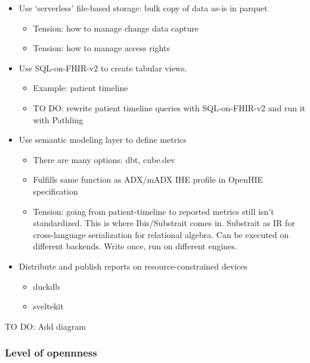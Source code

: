 \documentclass[
  authoryear]{elsarticle}
\providecommand{\tightlist}{%
  \setlength{\itemsep}{0pt}\setlength{\parskip}{0pt}}\usepackage{longtable,booktabs,array}
\begin{document}
\begin{itemize}
\tightlist
\item
  Use `serverless' file-based storage: bulk copy of data as-is in
  parquet

  \begin{itemize}
  \tightlist
  \item
    Tension: how to manage change data capture
  \item
    Tension: how to manage access rights
  \end{itemize}
\item
  Use SQL-on-FHIR-v2 to create tabular views.

  \begin{itemize}
  \tightlist
  \item
    Example: patient timeline
  \item
    TO DO: rewrite patient timeline queries with SQL-on-FHIR-v2 and run
    it with Pathling
  \end{itemize}
\item
  Use semantic modeling layer to define metrics

  \begin{itemize}
  \tightlist
  \item
    There are many options: dbt, cube.dev
  \item
    Fulfills same function as ADX/mADX IHE profile in OpenHIE
    specification
  \item
    Tension: going from patient-timeline to reported metrics still isn't
    standardized. This is where Ibis/Substrait comes in. Substrait as IR
    for cross-language serialization for relational algebra. Can be
    executed on different backends. Write once, run on different
    engines.
  \end{itemize}
\item
  Distribute and publish reports on resource-constrained devices

  \begin{itemize}
  \tightlist
  \item
    duckdb
  \item
    sveltekit
  \end{itemize}
\end{itemize}

TO DO: Add diagram

\subsubsection{Level of opennness}\label{level-of-opennness-2}
\end{document}
